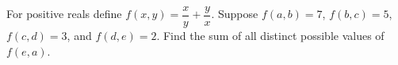For positive reals define $f(x,y)=\dfrac{x}{y}+\dfrac{y}{x}$. Suppose $f(a,b)=7$, $f(b,c)=5$, $f(c,d)=3$, and $f(d,e)=2$. Find the sum of all distinct possible values of $f(e,a)$.
